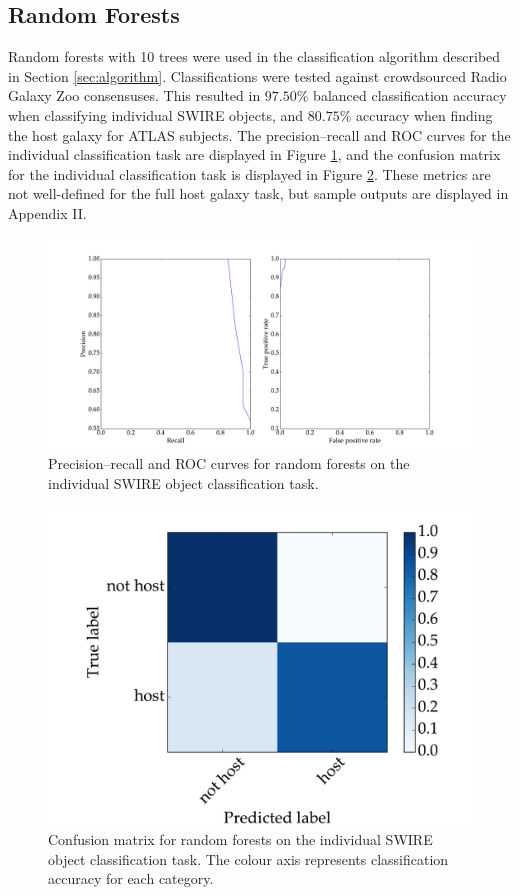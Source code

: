 \documentclass[a4paper]{article}
\newcommand{\fig}{Figure }
\newcommand{\sect}{Section }
\newcommand{\app}{Appendix }
\begin{document}
    \subsection{Random Forests}

      Random forests with 10 trees were used in the classification algorithm described in \sect \ref{sec:algorithm}. Classifications were tested against crowdsourced Radio Galaxy Zoo consensuses. This resulted in $97.50\%$ balanced classification accuracy when classifying individual SWIRE objects, and $80.75\%$ accuracy when finding the host galaxy for ATLAS subjects. The precision--recall and ROC curves for the individual classification task are displayed in \fig \ref{fig:precision-recall-roc-rf}, and the confusion matrix for the individual classification task is displayed in \fig \ref{fig:confusion-rf}. These metrics are not well-defined for the full host galaxy task, but sample outputs are displayed in \app II.

      \begin{figure}
        \centering
        \includegraphics[width=\linewidth]{images/metrics_rf.pdf}
        \caption{Precision--recall and ROC curves for random forests on the individual SWIRE object classification task.}
        \label{fig:precision-recall-roc-rf}
      \end{figure}

      \begin{figure}
        \centering
        \includegraphics[width=0.5\linewidth]{images/confusion_rf.pdf}
        \caption{Confusion matrix for random forests on the individual SWIRE object classification task. The colour axis represents classification accuracy for each category.}
        \label{fig:confusion-rf}
      \end{figure}
\end{document}
